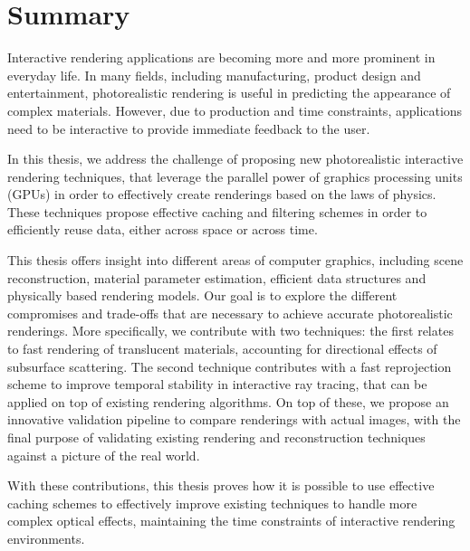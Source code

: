 \chapter{Summary}

Interactive rendering applications are becoming more and more prominent in everyday life. In many fields, including manufacturing, product design and entertainment, photorealistic rendering is useful in predicting the appearance of complex materials. However, due to production and time constraints, applications need to be interactive to provide immediate feedback to the user.

In this thesis, we address the challenge of proposing new photorealistic interactive rendering techniques, that leverage the parallel power of graphics processing units (GPUs) in order to effectively create renderings based on the laws of physics. These techniques propose effective caching and filtering schemes in order to efficiently reuse data, either across space or across time.     
 
This thesis offers insight into different areas of computer graphics, including scene reconstruction, material parameter estimation, efficient data structures and physically based rendering models. Our goal is to explore the different compromises and trade-offs that are necessary to achieve accurate photorealistic renderings. More specifically, we contribute with two techniques: the first relates to fast rendering of translucent materials, accounting for directional effects of subsurface scattering. The second technique contributes with a fast reprojection scheme to improve temporal stability in interactive ray tracing, that can be applied on top of existing rendering algorithms. On top of these, we propose an innovative validation pipeline to compare renderings with actual images, with the final purpose of validating existing rendering and reconstruction techniques against a picture of the real world. 

With these contributions, this thesis proves how it is possible to use effective caching schemes to effectively improve existing techniques to handle more complex optical effects, maintaining the time constraints of interactive rendering environments.